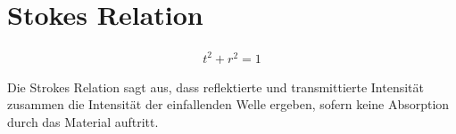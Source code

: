 
\newpage
\section{Stokes Relation}
\label{sec:stokesRelation}

\begin{align}
    t^2 + r^2 = 1 
\end{align}

Die Strokes Relation sagt aus, dass reflektierte und transmittierte Intensität zusammen die Intensität der einfallenden Welle ergeben, sofern keine Absorption durch das Material auftritt.